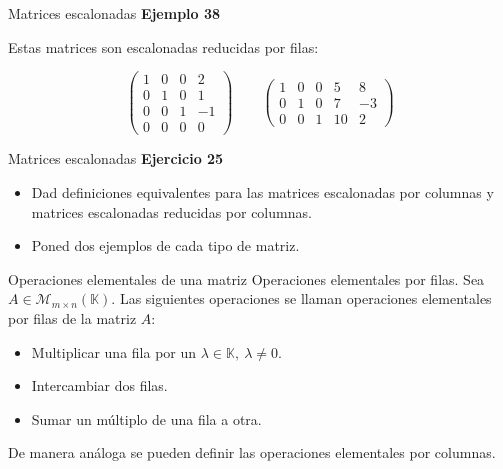 \documentclass[
  ignorenonframetext,
]{beamer}
\providecommand{\tightlist}{%
  \setlength{\itemsep}{0pt}\setlength{\parskip}{0pt}}
\begin{document}
\begin{frame}{Matrices escalonadas}
\protect\hypertarget{matrices-escalonadas-3}{}
\textbf{Ejemplo 38}

Estas matrices son escalonadas reducidas por filas:

\[\begin{pmatrix}1&0&0&2\\0&1&0&1\\0&0&1&-1\\0&0&0&0\end{pmatrix}\qquad \begin{pmatrix}1&0&0&5&8\\0&1&0&7&-3\\0&0&1&10&2\end{pmatrix} \]
\end{frame}

\begin{frame}{Matrices escalonadas}
\protect\hypertarget{matrices-escalonadas-4}{}
\textbf{Ejercicio 25}

\begin{itemize}
\item
  Dad definiciones equivalentes para las matrices escalonadas por
  columnas y matrices escalonadas reducidas por columnas.
\item
  Poned dos ejemplos de cada tipo de matriz.
\end{itemize}
\end{frame}

\begin{frame}{Operaciones elementales de una matriz}
\protect\hypertarget{operaciones-elementales-de-una-matriz}{}
Operaciones elementales por filas. Sea
\(A\in\mathcal{M}_{m\times n}(\mathbb{K})\). Las siguientes operaciones
se llaman operaciones elementales por filas de la matriz \(A\):

\begin{itemize}
\tightlist
\item
  Multiplicar una fila por un \(\lambda\in\mathbb{K},\ \lambda\ne 0\).
\item
  Intercambiar dos filas.
\item
  Sumar un múltiplo de una fila a otra.
\end{itemize}

De manera análoga se pueden definir las operaciones elementales por
columnas.
\end{frame}
\end{document}
